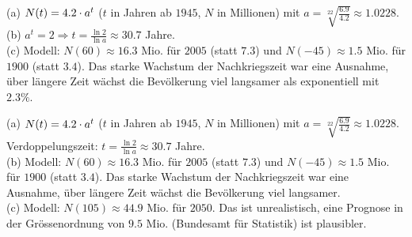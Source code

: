 \documentclass[11pt]{exam}
\begin{document}
\begin{questions}
{\begin{solution}
		(a) $N(t)=4.2\cdot a^t$ ($t$ in Jahren ab $1945$, $N$ in Millionen) mit $a=\sqrt[22]{\frac{6.9}{4.2}}\approx1.0228$.\\
		(b) $a^t=2\Rightarrow t=\frac{\ln{2}}{\ln{a}}\approx30.7$ Jahre.\\
		(c) Modell: $N(60)\approx16.3$ Mio. für $2005$ (statt $7.3$) und $N(-45)\approx1.5$ Mio. für $1900$ (statt $3.4$). Das starke Wachstum der Nachkriegszeit war eine Ausnahme, über längere Zeit wächst die Bevölkerung viel langsamer als exponentiell mit $2.3\%$.
\end{solution}}
{}

\question[8]
{\begin{solution}
		(a) $N(t)=4.2\cdot a^t$ ($t$ in Jahren ab $1945$, $N$ in Millionen) mit $a=\sqrt[22]{\frac{6.9}{4.2}}\approx1.0228$. Verdoppelungszeit: $t=\frac{\ln{2}}{\ln{a}}\approx30.7$ Jahre.\\
		(b) Modell: $N(60)\approx16.3$ Mio. für $2005$ (statt $7.3$) und $N(-45)\approx1.5$ Mio. für $1900$ (statt $3.4$). Das starke Wachstum der Nachkriegszeit war eine Ausnahme, über längere Zeit wächst die Bevölkerung viel langsamer.\\
		(c) Modell: $N(105)\approx44.9$ Mio. für $2050$. Das ist unrealistisch, eine Prognose in der Grössenordnung von $9.5$ Mio. (Bundesamt für Statistik) ist plausibler.
\end{solution}}
{}


\end{questions}
\end{document}
